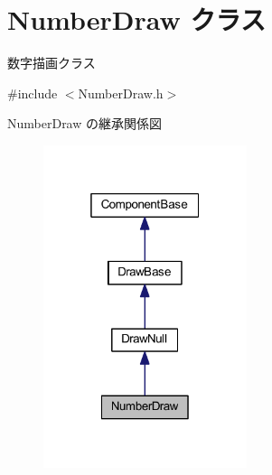 \hypertarget{class_number_draw}{}\section{Number\+Draw クラス}
\label{class_number_draw}


数字描画クラス  




{\ttfamily \#include $<$Number\+Draw.\+h$>$}



Number\+Draw の継承関係図\nopagebreak
\begin{figure}[H]
\begin{center}
\leavevmode
\includegraphics[width=169pt]{class_number_draw__inherit__graph}
\end{center}
\end{figure}
